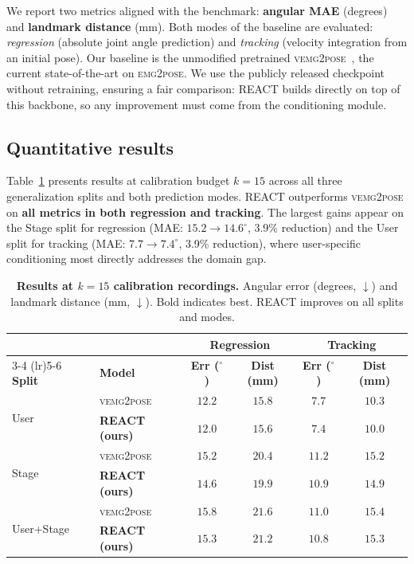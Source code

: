 \documentclass[conference]{IEEEtran}
\begin{document}
We report two metrics aligned with the benchmark: \textbf{angular MAE} (degrees) and \textbf{landmark distance} (mm). Both modes of the baseline are evaluated: \emph{regression} (absolute joint angle prediction) and \emph{tracking} (velocity integration from an initial pose). Our baseline is the unmodified pretrained \textsc{vemg2pose}~\cite{salter2024emg2pose}, the current state-of-the-art on \textsc{emg2pose}. We use the publicly released checkpoint without retraining, ensuring a fair comparison: REACT builds directly on top of this backbone, so any improvement must come from the conditioning module.

\subsection{Quantitative results}
\label{sec:main_results}

Table~\ref{tab:results} presents results at calibration budget $k{=}15$ across all three generalization splits and both prediction modes. REACT outperforms \textsc{vemg2pose} on \textbf{all metrics in both regression and tracking}. The largest gains appear on the Stage split for regression (MAE: $15.2 \to 14.6^\circ$, 3.9\% reduction) and the User split for tracking (MAE: $7.7 \to 7.4^\circ$, 3.9\% reduction), where user-specific conditioning most directly addresses the domain gap.

\begin{table}[t]
\centering
\caption{\textbf{Results at $k{=}15$ calibration recordings.} Angular error (degrees, $\downarrow$) and landmark distance (mm, $\downarrow$). Bold indicates best. REACT improves on all splits and modes.}
\label{tab:results}
\begin{tabular}{llcccc}
\toprule
& & \multicolumn{2}{c}{\textbf{Regression}} & \multicolumn{2}{c}{\textbf{Tracking}} \\
\cmidrule(lr){3-4} \cmidrule(lr){5-6}
\textbf{Split} & \textbf{Model} & \textbf{Err ($^\circ$)} & \textbf{Dist (mm)} & \textbf{Err ($^\circ$)} & \textbf{Dist (mm)} \\
\midrule
\multirow{2}{*}{User}
  & \textsc{vemg2pose}    & $12.2$ & $15.8$ & $7.7$  & $10.3$ \\
  & \textbf{REACT (ours)} & $\mathbf{12.0}$ & $\mathbf{15.6}$ & $\mathbf{7.4}$  & $\mathbf{10.0}$ \\
\midrule
\multirow{2}{*}{Stage}
  & \textsc{vemg2pose}    & $15.2$ & $20.4$ & $11.2$ & $15.2$ \\
  & \textbf{REACT (ours)} & $\mathbf{14.6}$ & $\mathbf{19.9}$ & $\mathbf{10.9}$ & $\mathbf{14.9}$ \\
\midrule
\multirow{2}{*}{User+Stage}
  & \textsc{vemg2pose}    & $15.8$ & $21.6$ & $11.0$ & $15.4$ \\
  & \textbf{REACT (ours)} & $\mathbf{15.3}$ & $\mathbf{21.2}$ & $\mathbf{10.8}$ & $\mathbf{15.3}$ \\
\bottomrule
\end{tabular}
\end{table}
\end{document}
